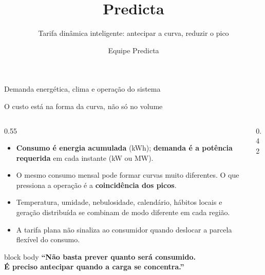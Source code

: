 \documentclass[aspectratio=169,11pt]{beamer}
\title{\Huge Predicta}
\subtitle{Tarifa dinâmica inteligente: antecipar a curva, reduzir o pico}
\author{Equipe Predicta}
\date{}
\begin{document}
\begin{frame}
  \titlepage
  \centering
  \textcolor{cinza}{Demanda energética, clima e operação do sistema}
\end{frame}

\begin{frame}{O custo está na forma da curva, não só no volume}
  \begin{columns}[T]
    \begin{column}{0.55\textwidth}
      \vspace{2mm}
      \begin{itemize}\setlength\itemsep{2.5mm}
        \item \textbf{Consumo é energia acumulada} (kWh); \textbf{demanda é a potência requerida} em cada instante (kW ou MW).
        \item O mesmo consumo mensal pode formar curvas muito diferentes. O que pressiona a operação é a \textbf{coincidência dos picos}.
        \item Temperatura, umidade, nebulosidade, calendário, hábitos locais e geração distribuída se combinam de modo diferente em cada região.
        \item A tarifa plana não sinaliza ao consumidor quando deslocar a parcela flexível do consumo.
      \end{itemize}
      \vspace{3mm}
      \begin{beamercolorbox}[rounded=true,sep=3mm]{block body}
        \centering\textbf{\textcolor{laranja}{``Não basta prever quanto será consumido.\\ É preciso antecipar quando a carga se concentra.''}}
      \end{beamercolorbox}
    \end{column}
    \begin{column}{0.42\textwidth}
      \centering
    \end{column}
  \end{columns}
\end{frame}
\end{document}
